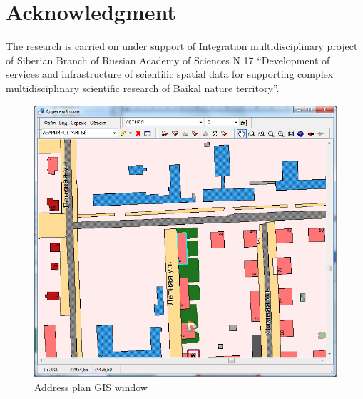 \documentclass[conference]{IEEEtran}
\begin{document}
\section*{Acknowledgment}
The research is carried on under support of Integration multidisciplinary project of Siberian Branch of Russian Academy of Sciences N 17 ``Development of services and infrastructure of scientific spatial data for supporting complex multidisciplinary scientific research of Baikal nature territory''.


\begin{figure}[t]
  \centering
  \includegraphics[width=0.9\linewidth]{addressplan.png}
  \caption{Address plan GIS window}
  \label{fig:addrplan}
\end{figure}




\end{document}
